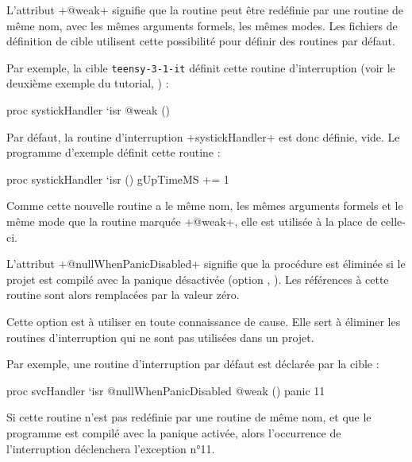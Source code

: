 
L'attribut \plm+@weak+ signifie que la routine peut être redéfinie par une routine de même nom, avec les mêmes arguments formels, les mêmes modes. Les fichiers de définition de cible utilisent cette possibilité pour définir des routines par défaut.

Par exemple, la cible \texttt{teensy-3-1-it} définit cette routine d'interruption (voir le deuxième exemple du tutorial, ) :

\begin{PLM}
proc systickHandler `isr @weak () {
}
\end{PLM}

Par défaut, la routine d'interruption \plm+systickHandler+ est donc définie, vide. Le programme d'exemple définit cette routine :

\begin{PLM}
proc systickHandler `isr () {
  gUpTimeMS += 1
}
\end{PLM}

Comme cette nouvelle routine a le même nom, les mêmes arguments formels et le même mode que la routine marquée \plm+@weak+, elle est utilisée à la place de celle-ci.







L'attribut \plm+@nullWhenPanicDisabled+ signifie que la procédure est éliminée si le projet est compilé avec la panique désactivée (option , ). Les références à cette routine sont alors remplacées par la valeur zéro.

Cette option est à utiliser en toute connaissance de cause. Elle sert à éliminer les routines d'interruption qui ne sont pas utilisées dans un projet.

Par exemple, une routine d'interruption par défaut est déclarée par la cible :

\begin{PLM}
proc svcHandler `isr @nullWhenPanicDisabled @weak () {
  panic 11
}
\end{PLM}

Si cette routine n'est pas redéfinie par une routine de même nom, et que le programme est compilé avec la panique activée, alors l'occurrence de l'interruption déclenchera l'exception n°11.

